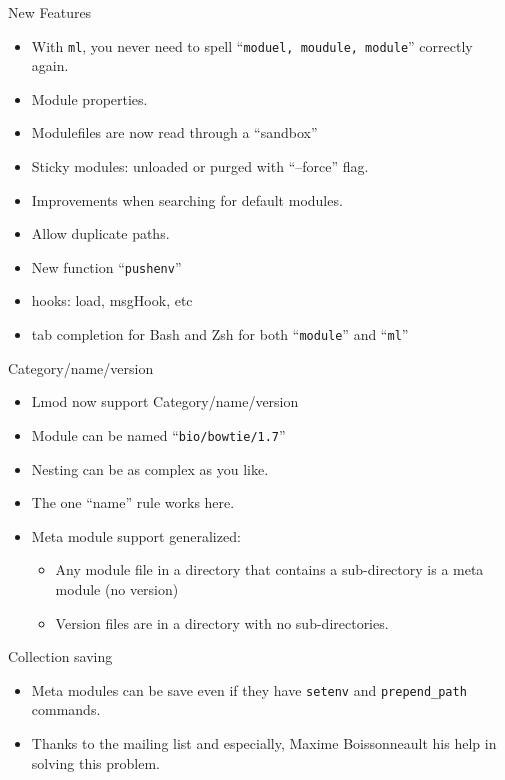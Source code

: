 \documentclass{beamer}
\begin{document}
\begin{frame}{New Features}
  \begin{itemize}
    \item With \texttt{ml}, you never need to spell ``\texttt{moduel, moudule, module}''
      correctly again.
    \item Module properties.
    \item Modulefiles are now read through a ``sandbox''
    \item Sticky modules: unloaded or purged with ``--force'' flag.
    \item Improvements when searching for default modules.
    \item Allow duplicate paths.
    \item New function ``\texttt{pushenv}''
    \item hooks: load, msgHook, etc
    \item tab completion for Bash and Zsh for both ``\texttt{module}'' and ``\texttt{ml}''
  \end{itemize}
\end{frame}


\begin{frame}{Category/name/version}
  \begin{itemize}
    \item Lmod now support Category/name/version
    \item Module can be named ``\texttt{bio/bowtie/1.7}''
    \item Nesting can be as complex as you like.
    \item The one ``name'' rule works here.
    \item Meta module support generalized:
      \begin{itemize}
        \item Any module file in a directory that contains a
          sub-directory is a meta module (no version)
        \item Version files are in a directory with no sub-directories.
      \end{itemize}
  \end{itemize}
\end{frame}

\begin{frame}{Collection saving}
  \begin{itemize}
    \item Meta modules can be save even if they have \texttt{setenv}
      and \texttt{prepend\_path} commands.
    \item Thanks to the mailing list and especially, Maxime
      Boissonneault his help in solving this problem.
  \end{itemize}
\end{frame}
\end{document}
